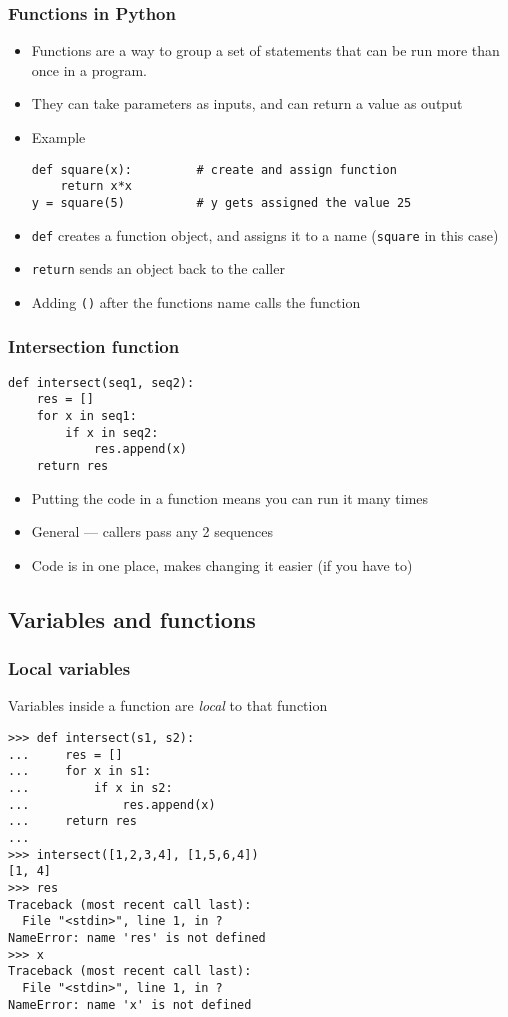 \begin{frame}[fragile]
  \frametitle{Functions in Python}

  \begin{itemize}
  \item<1-> Functions are a way to group a set of statements that can be run
    more than once in a program.
  \item<1-> They can take parameters as inputs, and can return a value as
    output
  \item<2-> Example
\begin{verbatim}
def square(x):         # create and assign function
    return x*x
y = square(5)          # y gets assigned the value 25
\end{verbatim}

    \item<3-> \texttt{def} creates a function object, and assigns it to a
      name (\texttt{square} in this case)
    \item<3-> \texttt{return} sends an object back to the caller
    \item<3-> Adding \texttt{()} after the functions name calls the function
  \end{itemize}
\end{frame}


\begin{frame}[fragile]
  \frametitle{Intersection function}

\begin{verbatim}
def intersect(seq1, seq2):
    res = []
    for x in seq1:
        if x in seq2:
            res.append(x)
    return res
\end{verbatim}

  \pause

  \begin{itemize}
  \item Putting the code in a function means you can run it many times
  \item General --- callers pass any 2 sequences
  \item Code is in one place, makes changing it easier (if you have to)
  \end{itemize}
\end{frame}

\subsection{Variables and functions}
\begin{frame}[fragile]
  \frametitle{Local variables}
Variables inside a function are \emph{local} to that function
{\footnotesize
\begin{verbatim}
>>> def intersect(s1, s2):   
...     res = []
...     for x in s1:
...         if x in s2:
...             res.append(x)
...     return res
... 
>>> intersect([1,2,3,4], [1,5,6,4])
[1, 4]
>>> res
Traceback (most recent call last):
  File "<stdin>", line 1, in ?
NameError: name 'res' is not defined
>>> x
Traceback (most recent call last):
  File "<stdin>", line 1, in ?
NameError: name 'x' is not defined
\end{verbatim}}
\end{frame}

